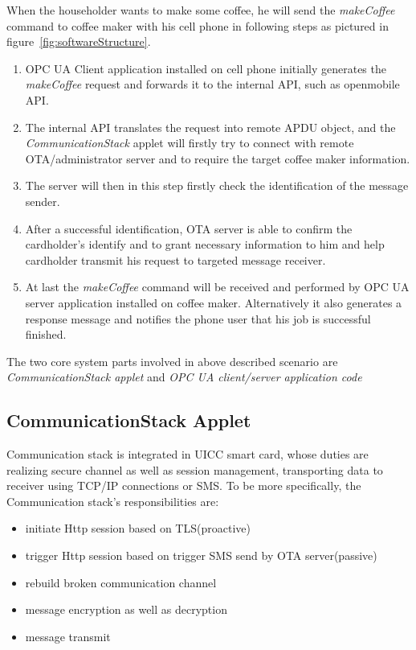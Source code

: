 When the householder wants to make some coffee, he will send the \emph{makeCoffee} command to coffee maker with his cell phone in following steps as pictured in figure~\ref{fig:softwareStructure}. 
\begin{enumerate}
\item OPC UA Client application installed on cell phone initially generates the \emph{makeCoffee} request and forwards it to the internal API, such as openmobile API.
\item The internal API translates the request into remote APDU object, and the \emph{CommunicationStack} applet will firstly try to connect with remote OTA/administrator server and to require the target coffee maker information.
\item The server will then in this step firstly check the identification of the message sender.
\item After a successful identification, OTA server is able to confirm the cardholder's identify and to grant necessary information to him and help cardholder transmit his request to targeted message receiver.
\item  At last the \emph{makeCoffee} command will be received and performed by OPC UA server application installed on coffee maker. Alternatively it also generates a response message and notifies the phone user that his job is successful  finished. 
\end{enumerate}
The two core system parts involved in above described scenario are \emph{CommunicationStack applet} and \emph{OPC UA client/server application code} 

\subsection{CommunicationStack Applet}
Communication stack is integrated in UICC smart card, whose duties are realizing secure channel as well as session management, transporting data to receiver using TCP/IP connections or SMS. To be more specifically, the Communication stack's responsibilities are:
\begin{itemize}
  \item initiate Http session based on TLS(proactive)
  \item trigger Http session based on trigger SMS send by OTA server(passive)
  \item rebuild broken communication channel
  \item message encryption as well as decryption
  \item message transmit
\end{itemize}

